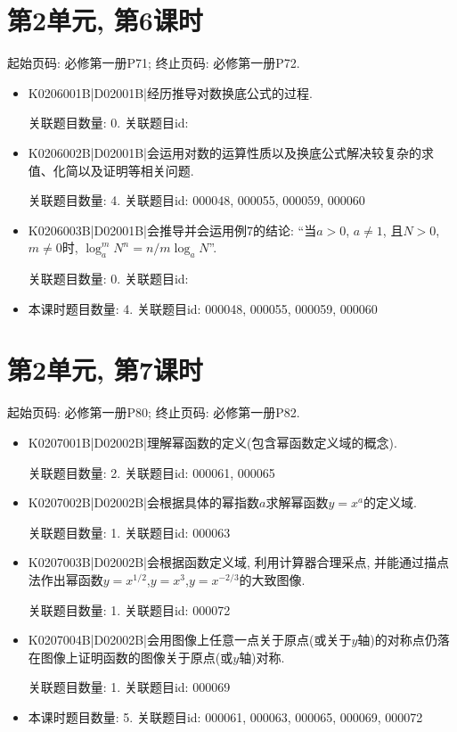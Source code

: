 \section*{第2单元, 第6课时}
起始页码: 必修第一册P71; 终止页码: 必修第一册P72.
\begin{itemize}
\item K0206001B|D02001B|经历推导对数换底公式的过程.

关联题目数量: 0. 关联题目id: 

\item K0206002B|D02001B|会运用对数的运算性质以及换底公式解决较复杂的求值、化简以及证明等相关问题.

关联题目数量: 4. 关联题目id: 000048, 000055, 000059, 000060

\item K0206003B|D02001B|会推导并会运用例7的结论: ``当$a>0$, $a\neq1$, 且$N>0$, $m\neq0$时, $\log_a^{m}N^{n}=n/m\log_aN$''.

关联题目数量: 0. 关联题目id: 

\item 本课时题目数量: 4. 关联题目id: 000048, 000055, 000059, 000060

\end{itemize}

\section*{第2单元, 第7课时}
起始页码: 必修第一册P80; 终止页码: 必修第一册P82.
\begin{itemize}
\item K0207001B|D02002B|理解幂函数的定义(包含幂函数定义域的概念).

关联题目数量: 2. 关联题目id: 000061, 000065

\item K0207002B|D02002B|会根据具体的幂指数$a$求解幂函数$y=x^{a}$的定义域.

关联题目数量: 1. 关联题目id: 000063

\item K0207003B|D02002B|会根据函数定义域, 利用计算器合理采点, 并能通过描点法作出幂函数$y=x^{1/2}$,$y=x^{3}$,$y=x^{-2/3}$的大致图像.

关联题目数量: 1. 关联题目id: 000072

\item K0207004B|D02002B|会用图像上任意一点关于原点(或关于$y$轴)的对称点仍落在图像上证明函数的图像关于原点(或$y$轴)对称.

关联题目数量: 1. 关联题目id: 000069

\item 本课时题目数量: 5. 关联题目id: 000061, 000063, 000065, 000069, 000072

\end{itemize}

